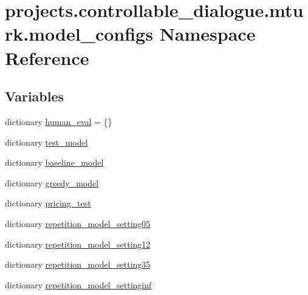 \hypertarget{namespaceprojects_1_1controllable__dialogue_1_1mturk_1_1model__configs}{}\section{projects.\+controllable\+\_\+dialogue.\+mturk.\+model\+\_\+configs Namespace Reference}
\label{namespaceprojects_1_1controllable__dialogue_1_1mturk_1_1model__configs}
\subsection*{Variables}
\begin{DoxyCompactItemize}
\item 
dictionary \hyperlink{namespaceprojects_1_1controllable__dialogue_1_1mturk_1_1model__configs_af8d4e48dab3aaa559c5ae898df841a07}{human\+\_\+eval} = \{\}
\item 
dictionary \hyperlink{namespaceprojects_1_1controllable__dialogue_1_1mturk_1_1model__configs_aca29ef10b645ef9cea9501f588e59bc7}{test\+\_\+model}
\item 
dictionary \hyperlink{namespaceprojects_1_1controllable__dialogue_1_1mturk_1_1model__configs_ac7e33cb0724a408acd72a78ad74ea684}{baseline\+\_\+model}
\item 
dictionary \hyperlink{namespaceprojects_1_1controllable__dialogue_1_1mturk_1_1model__configs_afc814eb3664ad0c090f8aa371c9e0a12}{greedy\+\_\+model}
\item 
dictionary \hyperlink{namespaceprojects_1_1controllable__dialogue_1_1mturk_1_1model__configs_ab20cdcaf8ff8011f4dbf61a11c307148}{pricing\+\_\+test}
\item 
dictionary \hyperlink{namespaceprojects_1_1controllable__dialogue_1_1mturk_1_1model__configs_aa9c14f2ee30f0b20ac81deaa4e87a6d6}{repetition\+\_\+model\+\_\+setting05}
\item 
dictionary \hyperlink{namespaceprojects_1_1controllable__dialogue_1_1mturk_1_1model__configs_aa26681468861cea27c7e1f23cebb405d}{repetition\+\_\+model\+\_\+setting12}
\item 
dictionary \hyperlink{namespaceprojects_1_1controllable__dialogue_1_1mturk_1_1model__configs_a3c5ef8bede5e6e08db3259ab9f1676c2}{repetition\+\_\+model\+\_\+setting35}
\item 
dictionary \hyperlink{namespaceprojects_1_1controllable__dialogue_1_1mturk_1_1model__configs_acc4ba91ee68d242d3c301f65af7a1834}{repetition\+\_\+model\+\_\+settinginf}

\end{DoxyCompactItemize}
